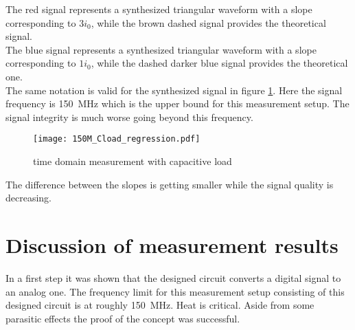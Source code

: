 The red signal represents a synthesized triangular waveform with a slope corresponding to $3 i_0$, while the brown dashed signal provides the theoretical signal.\\
The blue signal represents a synthesized triangular waveform with a slope corresponding to $1 i_0$, while the dashed darker blue signal provides the theoretical one.\\
The same notation is valid for the synthesized signal in figure \ref{fig:measCload150M}.
Here the signal frequency is \SI{150}{\mega \hertz} which is the upper bound for this measurement setup.
The signal integrity is much worse going beyond this frequency.

\begin{figure}[htb!]
	\centering
  \texttt{[image: 150M\_Cload\_regression.pdf]}
	\caption{time domain measurement with capacitive load}
	\label{fig:measCload150M}
\end{figure}

The difference between the slopes is getting smaller while the signal quality is decreasing.


\section{Discussion of measurement results}
In a first step it was shown that the designed circuit converts a digital signal to an analog one.
The frequency limit for this measurement setup consisting of this designed circuit is at roughly \SI{150}{\mega \hertz}.
Heat is critical. 
Aside from some parasitic effects the proof of the concept was successful.


